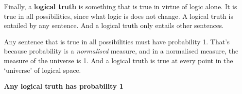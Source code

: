 Finally, a \textbf{logical truth} is something that is true in virtue of logic alone. It is true in all possibilities, since what logic is does not change. A logical truth is entailed by any sentence. And a logical truth only entails other sentences.

Any sentence that is true in all possibilities must have probability 1. That's because probability is a \textit{normalised} measure, and in a normalised measure, the measure of the universe is 1. And a logical truth is true at every point in the `universe' of logical space.

\begin{itemize*}
\item \textbf{Any logical truth has probability 1}
\end{itemize*}
